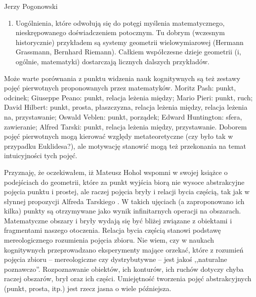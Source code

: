\begin{newrevengenv}{Jerzy Pogonowski}
\begin{enumerate}
\item Uogólnienia, które odwołują się do potęgi myślenia
matematycznego, nieskrępowanego doświadczeniem potocznym. Tu
dobrym (wczesnym historycznie) przykładem są systemy geometrii
wielowymiarowej (Hermann Grassmann, Bernhard Riemann). Całkiem
współczesne dzieje geometrii (i, ogólnie, matematyki) dostarczają
licznych dalszych przykładów.

\end{enumerate}

Może warte porównania z punktu widzenia nauk kognitywnych są też
zestawy pojęć pierwotnych proponowanych przez matematyków. Moritz
Pash: punkt, odcinek; Giuseppe Peano: punkt, relacja leżenia
między; Mario Pieri: punkt, ruch; David Hilbert: punkt, prosta,
płaszczyzna, relacja leżenia między, relacja leżenia na,
przystawanie; Oswald Veblen: punkt, porządek; Edward Huntington:
sfera, zawieranie; Alfred Tarski: punkt, relacja leżenia między,
przystawanie. Doborem pojęć pierwotnych mogą kierować względy
metateoretyczne (czy było tak w przypadku Euklidesa?), ale
motywację stanowić mogą też przekonania na temat intuicyjności
tych pojęć.

Przyznaję, że oczekiwałem, iż Mateusz Hohol wspomni w swojej
książce o podejściach do geometrii, które za punkt wyjścia biorą
nie wysoce abstrakcyjne pojęcia punktu i prostej, ale raczej
pojęcia bryły i relacji bycia częścią, tak jak w słynnej
propozycji Alfreda Tarskiego \parencite{tarski_les_1929}. W takich ujęciach (a
zaproponowano ich kilka) punkty są otrzymywane jako wynik
infinitarnych operacji na obszarach. Matematyczne obszary i bryły
wydają się być bliżej związane z obiektami i fragmentami naszego
otoczenia. Relacja bycia częścią stanowi podstawę mereologicznego
rozumienia pojęcia zbioru. Nie wiem, czy w naukach kognitywnych
przeprowadzano eksperymenty mające orzekać, które z rozumień
pojęcia zbioru -- mereologiczne czy dystrybutywne -- jest jakoś
,,naturalne poznawczo''. Rozpoznawanie obiektów, ich konturów, ich
ruchów dotyczy chyba raczej obszarów, brył oraz ich części.
Umiejętność tworzenia pojęć abstrakcyjnych (punkt, prosta, itp.)
jest rzecz jasna o wiele późniejsza.


\end{newrevengenv}
